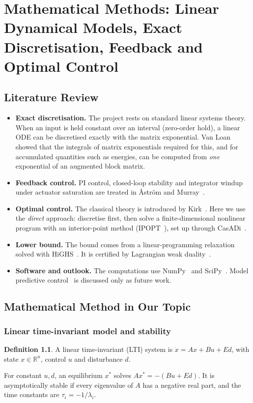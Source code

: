 \documentclass[12pt,a4paper]{report}
\theoremstyle{definition}
\newtheorem{definition}{Definition}[chapter]
\begin{document}
\chapter{Mathematical Methods: Linear Dynamical Models, Exact Discretisation, Feedback and Optimal Control}

\section{Literature Review}
\begin{itemize}
\item \textbf{Exact discretisation.} The project rests on standard linear systems theory. When an input is held constant over an interval (zero-order hold), a linear ODE can be discretised exactly with the matrix exponential. Van Loan~\cite{vanloan1978} showed that the integrals of matrix exponentials required for this, and for accumulated quantities such as energies, can be computed from \emph{one} exponential of an augmented block matrix.
\item \textbf{Feedback control.} PI control, closed-loop stability and integrator windup under actuator saturation are treated in \AA str\"om and Murray~\cite{astrom2021}.
\item \textbf{Optimal control.} The classical theory is introduced by Kirk~\cite{kirk2004}. Here we use the \emph{direct} approach: discretise first, then solve a finite-dimensional nonlinear program with an interior-point method (IPOPT~\cite{wachter2006}), set up through CasADi~\cite{andersson2019}.
\item \textbf{Lower bound.} The bound comes from a linear-programming relaxation solved with HiGHS~\cite{huangfu2018}. It is certified by Lagrangian weak duality~\cite{boyd2004}.
\item \textbf{Software and outlook.} The computations use NumPy~\cite{harris2020} and SciPy~\cite{virtanen2020}. Model predictive control~\cite{rawlings2017} is discussed only as future work.
\end{itemize}

\section{Mathematical Method in Our Topic}

\subsection*{Linear time-invariant model and stability}
\begin{definition}
A linear time-invariant (LTI) system is $\dot x = Ax + Bu + Ed$, with state $x\in\mathbb R^n$, control $u$ and disturbance $d$.

For constant $u,d$, an equilibrium $x^\ast$ solves $Ax^\ast=-(Bu+Ed)$. It is asymptotically stable if every eigenvalue of $A$ has a negative real part, and the time constants are $\tau_i=-1/\lambda_i$.
\end{definition}
\end{document}
